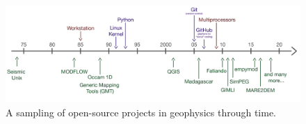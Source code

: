 \begin{figure}[!htb]
    \begin{center}
    \includegraphics[width=\textwidth]{figures/oss-timeline.png}
    \end{center}
\caption{
    A sampling of open-source projects in geophysics through time.
}
\label{fig:oss-timeline}
\end{figure}
